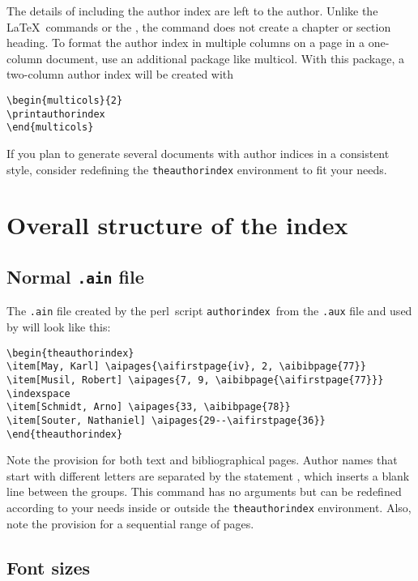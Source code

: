 \documentclass[a4paper]{article}
\newcommand{\package}[1]{\textsf{#1}}
\newcommand{\perl}{\textsf{perl}}
\newcommand{\file}[1]{\texttt{#1}}
\newcommand{\fnext}[1]{\file{.#1}}
\newcommand{\cmdline}[1]{\texttt{#1}}
\newcommand{\aiperl}{\cmdline{authorindex}}
\newcommand{\ltxinp}[1]{\texttt{\string#1}}
\begin{document}
The details of including the author index are left to the author.  Unlike the
\LaTeX\ commands \ltxinp{\printindex} or the \ltxinp{\thebibliography}, the
command \ltxinp{\printauthorindex} does not create a chapter or section
heading. To format the author index in multiple columns on a page in a
one-column document, use an additional package like \package{multicol}.  With
this package, a two-column author index will be created with
\begin{verbatim}
\begin{multicols}{2}
\printauthorindex
\end{multicols}
\end{verbatim}
If you plan to generate several documents with author indices in a consistent
style, consider redefining the \ltxinp{theauthorindex} environment to fit your
needs.


\section{Overall structure of the index}

\subsection{Normal \fnext{ain} file}

The \fnext{ain} file created by the \perl\ script \aiperl\ from the \fnext{aux}
file and used by \ltxinp{\printauthorindex} will look like this:
\begin{verbatim}
\begin{theauthorindex}
\item[May, Karl] \aipages{\aifirstpage{iv}, 2, \aibibpage{77}}
\item[Musil, Robert] \aipages{7, 9, \aibibpage{\aifirstpage{77}}}
\indexspace
\item[Schmidt, Arno] \aipages{33, \aibibpage{78}}
\item[Souter, Nathaniel] \aipages{29--\aifirstpage{36}}
\end{theauthorindex}
\end{verbatim}
Note the provision for both text and bibliographical pages. Author names that
start with different letters are separated by the statement
\ltxinp{\indexspace}, which inserts a blank line between the groups. This
command has no arguments but can be redefined according to your needs inside or
outside the \ltxinp{theauthorindex} environment. Also, note the provision for a
sequential range of pages.


\subsection{Font sizes}
\end{document}
